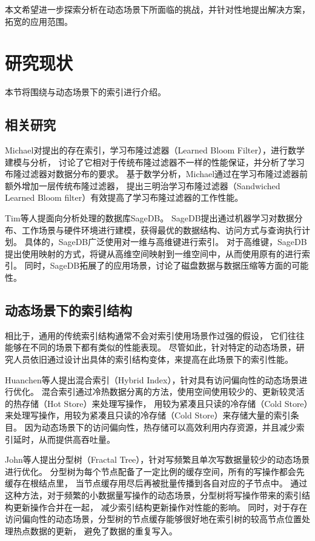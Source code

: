 本文希望进一步探索分析{\li}在动态场景下所面临的挑战，并针对性地提出解决方案，拓宽{\li}的应用范围。

\section{研究现状}

本节将围绕{\li}与动态场景下的索引进行介绍。

\subsection{{\li}相关研究}

Michael\cite{NIPS2018_7328}对提出的存在索引\cite{kraska2018case}，学习布隆过滤器（Learned Bloom Filter），进行数学建模与分析，
讨论了它相对于传统布隆过滤器不一样的性能保证，并分析了学习布隆过滤器对数据分布的要求。
基于数学分析，Michael通过在学习布隆过滤器前额外增加一层传统布隆过滤器，
提出三明治学习布隆过滤器（Sandwiched Learned Bloom ﬁlter）有效提高了学习布隆过滤器的工作性能。

Tim等人提面向分析处理的数据库SageDB\cite{kraska2019sagedb}。
SageDB提出通过机器学习对数据分布、工作场景与硬件环境进行建模，获得最优的数据结构、访问方式与查询执行计划。
具体的，SageDB广泛使用{\li}对一维与高维键进行索引。
对于高维键，SageDB提出使用映射的方式，将键从高维空间映射到一维空间中，从而使用原有的{\li}进行索引。
同时，SageDB拓展了{\li}的应用场景，讨论了磁盘数据与数据压缩等方面的可能性。

\subsection{动态场景下的索引结构}

相比于{\li}，通用的传统索引结构通常不会对索引使用场景作过强的假设，
它们往往能够在不同的场景下都有类似的性能表现。
尽管如此，针对特定的动态场景，研究人员依旧通过设计出具体的索引结构变体，来提高在此场景下的索引性能。

Huanchen等人提出混合索引\cite{zhang2016reducing}（Hybrid Index），针对具有访问偏向性的动态场景进行优化。
混合索引通过冷热数据分离的方法，使用空间使用较少的、更新较灵活的热存储（Hot Store）来处理写操作，
用较为紧凑且只读的冷存储（Cold Store）来处理写操作，用较为紧凑且只读的冷存储（Cold Store）来存储大量的索引条目。
因为动态场景下的访问偏向性，热存储可以高效利用内存资源，并且减少索引延时，从而提供高吞吐量。

John等人提出分型树\cite{esmet2012tokufs}（Fractal Tree），针对写频繁且单次写数据量较少的动态场景进行优化。
分型树为每个节点配备了一定比例的缓存空间，所有的写操作都会先缓存在根结点里，
当节点缓存用尽后再被批量传播到各自对应的子节点中。
通过这种方法，对于频繁的小数据量写操作的动态场景，分型树将写操作带来的索引结构更新操作合并在一起，
减少索引结构更新操作对性能的影响。
同时，对于存在访问偏向性的动态场景，分型树的节点缓存能够很好地在索引树的较高节点位置处理热点数据的更新，
避免了数据的重复写入。

